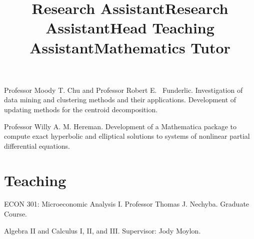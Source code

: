 \documentclass[overlapped,line,draft,11pt,letterpaper]{res}
\begin{document}
\begin{resume}
\title{Research Assistant}
\begin{position}
  Professor Moody T. Chu and Professor Robert E. \
  Funderlic.  Investigation of data mining and clustering methods and
  their applications. Development of updating methods for the centroid
  decomposition.
\end{position}

\title{Research Assistant}
\begin{position}
  Professor Willy A. M. Hereman. Development of a Mathematica
  package to compute exact hyperbolic and elliptical solutions to
  systems of nonlinear partial differential equations.
\end{position}


\section{\bf Teaching}


\title{Head Teaching Assistant}
\begin{position}
  ECON 301: Microeconomic Analysis I. Professor Thomas J. Nechyba.
  Graduate Course.
\end{position}

\title{Mathematics Tutor}
\begin{position}
  Algebra II and Calculus I, II, and III.  Supervisor: Jody Moylon.
\end{position}


%



\end{resume}
\end{document}
